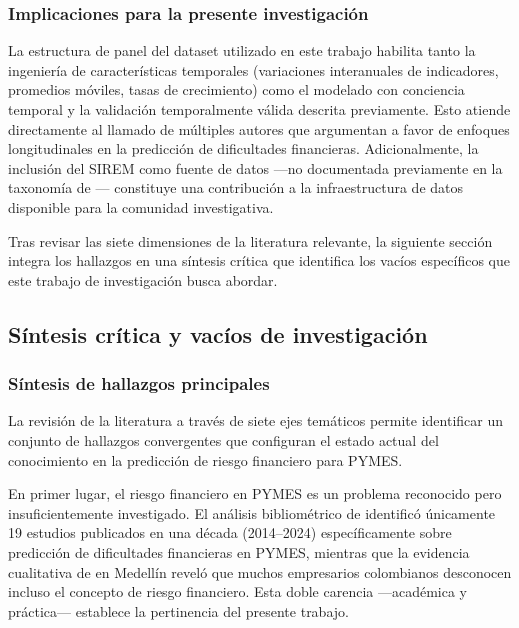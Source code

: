 \documentclass[12pt, letterpaper]{article}
\begin{document}
\subsubsection{Implicaciones para la presente investigaci\'on}

La estructura de panel del dataset utilizado en este trabajo habilita tanto la ingenier\'ia de caracter\'isticas temporales (variaciones interanuales de indicadores, promedios m\'oviles, tasas de crecimiento) como el modelado con conciencia temporal y la validaci\'on temporalmente v\'alida descrita previamente. Esto atiende directamente al llamado de m\'ultiples autores \citep{Zhou2022, Otsuki2022, Zhang2025, Bortolotti2024} que argumentan a favor de enfoques longitudinales en la predicci\'on de dificultades financieras. Adicionalmente, la inclusi\'on del SIREM como fuente de datos ---no documentada previamente en la taxonom\'ia de \citet{Wang2024datasets}--- constituye una contribuci\'on a la infraestructura de datos disponible para la comunidad investigativa.

Tras revisar las siete dimensiones de la literatura relevante, la siguiente secci\'on integra los hallazgos en una s\'intesis cr\'itica que identifica los vac\'ios espec\'ificos que este trabajo de investigaci\'on busca abordar.

\subsection{S\'intesis cr\'itica y vac\'ios de investigaci\'on}
\label{sec:sintesis}

\subsubsection{S\'intesis de hallazgos principales}

La revisi\'on de la literatura a trav\'es de siete ejes tem\'aticos permite identificar un conjunto de hallazgos convergentes que configuran el estado actual del conocimiento en la predicci\'on de riesgo financiero para PYMES.

En primer lugar, el riesgo financiero en PYMES es un problema reconocido pero insuficientemente investigado. El an\'alisis bibliom\'etrico de \citet{Abubakar2025} identific\'o \'unicamente 19 estudios publicados en una d\'ecada (2014--2024) espec\'ificamente sobre predicci\'on de dificultades financieras en PYMES, mientras que la evidencia cualitativa de \citet{CardonaZuleta2025} en Medell\'in revel\'o que muchos empresarios colombianos desconocen incluso el concepto de riesgo financiero. Esta doble carencia ---acad\'emica y pr\'actica--- establece la pertinencia del presente trabajo.
\end{document}
